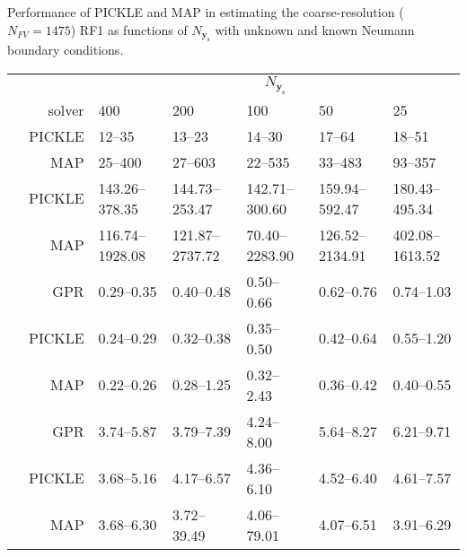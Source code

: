 \documentclass{agujournal2019}
\renewcommand{\caption}[2][]{\ignorespaces}
\begin{document}
\begin{table}[!htbp]
    \centering
    \caption{Performance of PICKLE and MAP in estimating the coarse-resolution ($N_{FV}=1475$) RF1 as functions of $N_{\mathbf{y}_{\mathrm{s}}}$ with \subref{tab:RF1_1x_unknown_flux_results} unknown and \subref{tab:RF1_1x_known_flux_results} known Neumann boundary conditions.}
    \label{tab:RF1_1x_flux_results}
    \begin{subtable}{\textwidth}
        \caption{Unknown Neumann boundary conditions}
        \label{tab:RF1_1x_unknown_flux_results}%
        \begin{tabu} to 
            \toprule
            & &  \\
            & solver & 400 & 200 & 100 & 50 & 25 \\
            \midrule
             & PICKLE & 12--35 & 13--23 & 14--30 & 17--64 & 18--51 \\
            & MAP & 25--400 & 27--603 & 22--535 & 33--483 & 93--357 \\
            \midrule
             & PICKLE & 143.26--378.35 & 144.73--253.47 & 142.71--300.60 & 159.94--592.47 & 180.43--495.34 \\
            & MAP & 116.74--1928.08 & 121.87--2737.72 & 70.40--2283.90 & 126.52--2134.91 & 402.08--1613.52 \\
            \midrule
             & GPR & 0.29--0.35 & 0.40--0.48 & 0.50--0.66 & 0.62--0.76 & 0.74--1.03 \\
            & PICKLE & 0.24--0.29 & 0.32--0.38 & 0.35--0.50 & 0.42--0.64 & 0.55--1.20 \\
            & MAP & 0.22--0.26 & 0.28--1.25 & 0.32--2.43 & 0.36--0.42 & 0.40--0.55 \\
            \midrule
             & GPR & 3.74--5.87 & 3.79--7.39 & 4.24--8.00 & 5.64--8.27 & 6.21--9.71 \\
            & PICKLE & 3.68--5.16 & 4.17--6.57 & 4.36--6.10 & 4.52--6.40 & 4.61--7.57 \\
            & MAP & 3.68--6.30 & 3.72--39.49 & 4.06--79.01 & 4.07--6.51 & 3.91--6.29 \\

\end{tabu}
\end{subtable}
\end{table}
\end{document}
